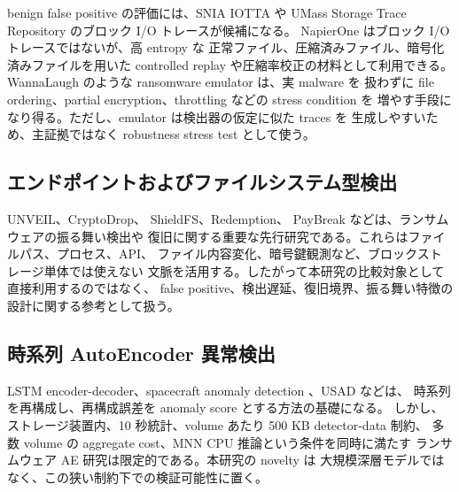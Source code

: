 benign false positive の評価には、SNIA IOTTA\cite{sniaiotta} や
UMass Storage Trace Repository\cite{umass} のブロック I/O トレースが候補になる。
NapierOne\cite{napierone} はブロック I/O トレースではないが、高 entropy な
正常ファイル、圧縮済みファイル、暗号化済みファイルを用いた controlled replay
や圧縮率校正の材料として利用できる。
WannaLaugh\cite{wannalaugh2024} のような ransomware emulator は、実 malware を
扱わずに file ordering、partial encryption、throttling などの stress condition を
増やす手段になり得る。ただし、emulator は検出器の仮定に似た traces を
生成しやすいため、主証拠ではなく robustness stress test として使う。

\subsection{エンドポイントおよびファイルシステム型検出}

UNVEIL\cite{kharraz2016unveil}、CryptoDrop\cite{scaife2016cryptodrop}、
ShieldFS\cite{continella2016shieldfs}、Redemption\cite{kharraz2017redemption}、
PayBreak\cite{kolodenker2017paybreak} などは、ランサムウェアの振る舞い検出や
復旧に関する重要な先行研究である。これらはファイルパス、プロセス、API、
ファイル内容変化、暗号鍵観測など、ブロックストレージ単体では使えない
文脈を活用する。したがって本研究の比較対象として直接利用するのではなく、
false positive、検出遅延、復旧境界、振る舞い特徴の設計に関する参考として扱う。

\subsection{時系列 AutoEncoder 異常検出}

LSTM encoder-decoder\cite{malhotra2016lstm}、spacecraft anomaly detection
\cite{hundman2018lstm}、USAD\cite{audibert2020usad} などは、
時系列を再構成し、再構成誤差を anomaly score とする方法の基礎になる。
しかし、ストレージ装置内、10 秒統計、volume あたり 500 KB detector-data 制約、
多数 volume の aggregate cost、MNN CPU 推論という条件を同時に満たす
ランサムウェア AE 研究は限定的である。本研究の novelty は
大規模深層モデルではなく、この狭い制約下での検証可能性に置く。
